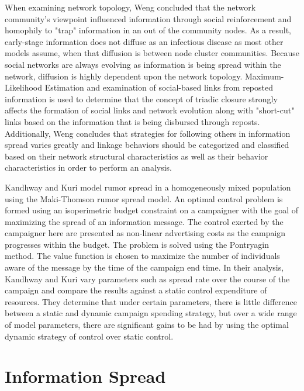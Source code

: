When examining network topology, Weng concluded that the network community's viewpoint influenced information through social reinforcement and homophily to "trap" information in an out of the community nodes. As a result, early-stage information does not diffuse as an infectious disease as most other models assume, when that diffusion is between node cluster communities. Because social networks are always evolving as information is being spread within the network, diffusion is highly dependent upon the network topology. Maximum-Likelihood Estimation and examination of social-based links from reposted information is used to determine that the concept of triadic closure strongly affects the formation of social links and network evolution along with "short-cut" links based on the information that is being disbursed through reposts. Additionally, Weng concludes that strategies for following others in information spread varies greatly and linkage behaviors should be categorized and classified based on their network structural characteristics as well as their behavior characteristics in order to perform an analysis. \cite{weng2014information}

Kandhway and Kuri model rumor spread in a homogeneously mixed population using the Maki-Thomson rumor spread model. An optimal control problem is formed using an isoperimetric budget constraint on a campaigner with the goal of maximizing the spread of an information message. The control exerted by the campaigner here are presented as non-linear advertising costs as the campaign progresses within the budget. The problem is solved using the Pontryagin method. The value function is chosen to maximize the number of individuals aware of the message by the time of the campaign end time. In their analysis, Kandhway and Kuri vary parameters such as spread rate over the course of the campaign and compare the results against a static control expenditure of resources. They determine that under certain parameters, there is little difference between a static and dynamic campaign spending strategy, but over a wide range of model parameters, there are significant gains to be had by using the optimal dynamic strategy of control over static control. \cite{kandhway2014optimal}

\section{Information Spread}

